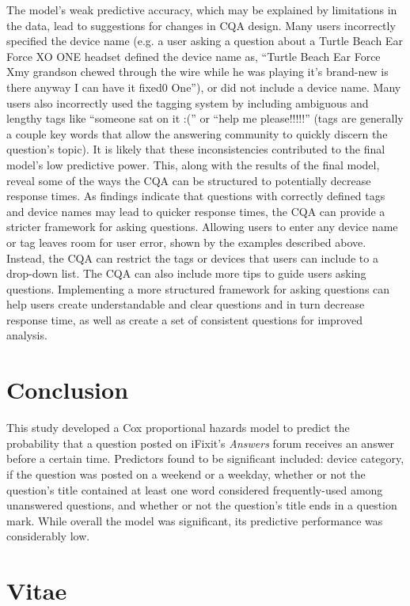 \documentclass[]{interact}\usepackage[]{graphicx}\usepackage[]{color}
\begin{document}
{The model's weak predictive accuracy, which may be explained by limitations in the data, lead to suggestions for changes in CQA design. Many users incorrectly specified the device name (e.g. a user asking a question about a Turtle Beach Ear Force XO ONE headset defined the device name as, ``Turtle Beach Ear Force Xmy grandson chewed through the wire while he was playing it's brand-new is there anyway I can have it fixed0 One''), or did not include a device name. Many users also incorrectly used the tagging system by including ambiguous and lengthy tags like ``someone sat on it :('' or ``help me please!!!!!'' (tags are generally a couple key words that allow the answering community to quickly discern the question's topic). It is likely that these inconsistencies contributed to the final model's low predictive power. This, along with the results of the final model, reveal some of the ways the CQA can be structured to potentially decrease response times. As findings indicate that questions with correctly defined tags and device names may lead to quicker response times, the CQA can provide a stricter framework for asking questions. Allowing users to enter any device name or tag leaves room for user error, shown by the examples described above. Instead, the CQA can restrict the tags or devices that users can include to a drop-down list. The CQA can also include more tips to guide users asking questions. Implementing a more structured framework for asking questions can help users create understandable and clear questions and in turn decrease response time, as well as create a set of consistent questions for improved analysis. 


\section{Conclusion}

This study developed a Cox proportional hazards model to predict the probability that a question posted on iFixit's \textit{Answers} forum receives an answer before a certain time. Predictors found to be significant included: device category, if the question was posted on a weekend or a weekday, whether or not the question's title contained at least one word considered frequently-used among unanswered questions, and whether or not the question's title ends in a question mark. While overall the model was significant, its predictive performance was considerably low. 


\section{Vitae}

}
\end{document}
